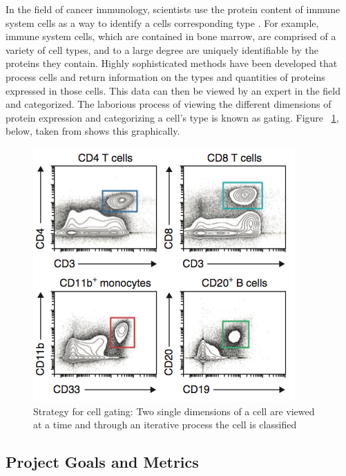 \documentclass{article}
\begin{document}
In the field of cancer immunology, scientists use the protein content of immune system cells as a way to identify a cells corresponding type \cite{Bendall:2011bm}. For example, immune system cells, which are contained in bone marrow, are comprised of a variety of cell types, and to a large degree are uniquely identifiable by the proteins they contain. Highly sophisticated methods have been developed that process cells and return information on the types and quantities of proteins expressed in those cells. This data can then be viewed by an expert in the field and categorized. The laborious process of viewing the different dimensions of protein expression and categorizing a cell's type is known as gating. Figure ~\ref{CellGating}, below, taken from \cite{Amir:2013jp} shows this graphically.

\begin{figure}[ht]
\label{CellGating}
\vskip 0.2in
\begin{center}
\centerline{\includegraphics[width=\columnwidth]{CellGating}}
\caption{Strategy for cell gating: Two single dimensions of a cell are viewed at a time
and through an iterative process the cell is classified}
\end{center}
\vskip -0.2in
\end{figure} 

\subsection{Project Goals and Metrics}
\end{document}
